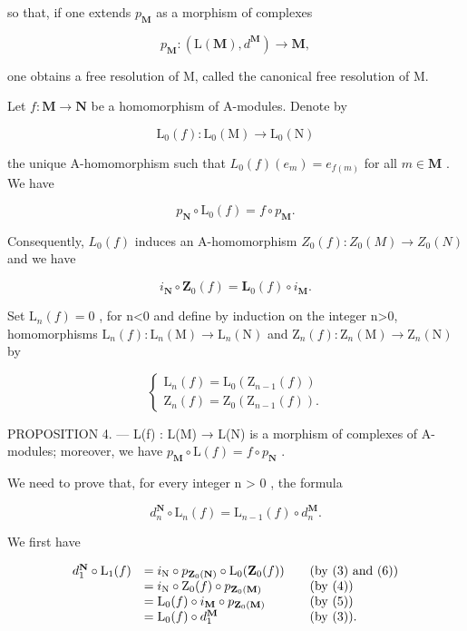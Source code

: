 so that, if one extends \(p_{\mathbf{M}}\) as a morphism of complexes

\[
p _ {\mathbf {M}}: (\mathrm{L} (\mathbf {M}), d ^ {\mathbf {M}}) \rightarrow \mathbf {M},
\]

one obtains a free resolution of M, called the canonical free resolution of M.

Let \(f: \mathbf{M} \to \mathbf{N}\) be a homomorphism of A-modules. Denote by

\[
\mathrm{L} _ {0} (f): \mathrm{L} _ {0} (\mathrm{M}) \rightarrow \mathrm{L} _ {0} (\mathrm{N})
\]

the unique A-homomorphism such that \(L_0(f)(e_m) = e_{f(m)}\) for all \(m \in \mathbf{M}\) . We have

\[
p _ {\mathbf {N}} \circ \mathrm{L} _ {0} (f) = f \circ p _ {\mathbf {M}}.\tag{4}
\]

Consequently, \(L_0(f)\) induces an A-homomorphism \(Z_0(f):Z_0(M)\to Z_0(N)\) and we have

\[
i _ {\mathbf {N}} \circ \mathbf {Z} _ {0} (f) = \mathbf {L} _ {0} (f) \circ i _ {\mathbf {M}}.\tag{5}
\]

Set \(\mathrm{L}_{n}(f)=0\) , for n\textless0 and define by induction on the integer n\textgreater0, homomorphisms \(\mathrm{L}_{n}(f):\mathrm{L}_{n}(\mathrm{M})\to\mathrm{L}_{n}(\mathrm{N})\) and \(\mathrm{Z}_{n}(f):\mathrm{Z}_{n}(\mathrm{M})\to\mathrm{Z}_{n}(\mathrm{N})\) by

\[
\left\{ \begin{array}{l} \mathrm{L} _ {n} (f) = \mathrm{L} _ {0} (\mathrm{Z} _ {n - 1} (f)) \\ \mathrm{Z} _ {n} (f) = \mathrm{Z} _ {0} (\mathrm{Z} _ {n - 1} (f)). \end{array} \right.\tag{6}
\]

PROPOSITION 4. --- L(f) : L(M) → L(N) is a morphism of complexes of A-modules; moreover, we have \(p_{\mathbf{M}} \circ \mathrm{L}(f) = f \circ p_{\mathbf{N}}\) .

We need to prove that, for every integer n \textgreater{} 0 , the formula

\[
d _ {n} ^ {\mathbf {N}} \circ \mathrm{L} _ {n} (f) = \mathrm{L} _ {n - 1} (f) \circ d _ {n} ^ {\mathbf {M}}.
\]

We first have

\[
\begin{array}{r l r l} d _ {1} ^ {\mathbf {N}} \circ \mathrm{L} _ {1} (f) & = i _ {\mathrm{N}} \circ p _ {\mathbf {Z} _ {0} (\mathbf {N})} \circ \mathrm{L} _ {0} (\mathbf {Z} _ {0} (f)) & & (\mathrm {by~(3)~and~(6)}) \\ & = i _ {\mathrm{N}} \circ \mathrm{Z} _ {0} (f) \circ p _ {\mathbf {Z} _ {0} (\mathbf {M})} & & (\mathrm {by~(4)}) \\ & = \mathrm{L} _ {0} (f) \circ i _ {\mathbf {M}} \circ p _ {\mathbf {Z} _ {0} (\mathbf {M})} & & (\mathrm {by~(5)}) \\ & = \mathrm{L} _ {0} (f) \circ d _ {1} ^ {\mathbf {M}} & & (\mathrm {by~(3))}. \end{array}
\]

